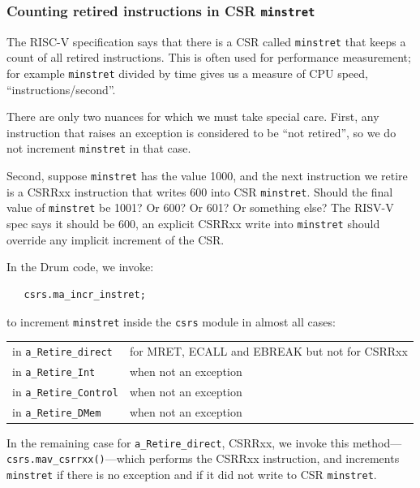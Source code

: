 
\subsubsection{Counting retired instructions in CSR {\tt minstret}}

The RISC-V specification says that there is a CSR called
\verb|minstret| that keeps a count of all retired instructions.  This
is often used for performance measurement; for example \verb|minstret|
divided by time gives us a measure of CPU speed,
``instructions/second''.

There are only two nuances for which we must take special care.
First, any instruction that raises an exception is considered to be
``not retired'', so we do not increment \verb|minstret| in that case.

Second, suppose \verb|minstret| has the value 1000, and the next
instruction we retire is a CSRRxx instruction that writes 600 into CSR
\verb|minstret|.  Should the final value of \verb|minstret| be 1001?
Or 600? Or 601? Or something else?  The RISV-V spec says it should be
600, {\ie} an explicit CSRRxx write into \verb|minstret| should
override any implicit increment of the CSR.

In the Drum code, we invoke:

{\footnotesize
\begin{Verbatim}
   csrs.ma_incr_instret;
\end{Verbatim}
}

to increment \verb|minstret| inside the \verb|csrs| module in almost
all cases:

\hmm
\begin{tabular}{ll}
 in {\tt a\_Retire\_direct}   & for MRET, ECALL and EBREAK but not for CSRRxx \\
 in {\tt a\_Retire\_Int}      & when not an exception \\
 in {\tt a\_Retire\_Control}  & when not an exception \\
 in {\tt a\_Retire\_DMem}     & when not an exception
\end{tabular}

In the remaining case for {\tt a\_Retire\_direct}, CSRRxx, we invoke
this method---{\tt csrs.mav\_csrrxx()}---which performs the CSRRxx
instruction, and increments \verb|minstret| if there is no exception
and if it did not write to CSR \verb|minstret|.



